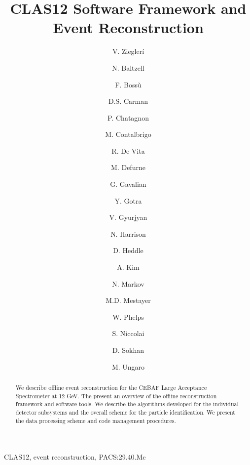 \documentclass[3p,times,twocolumn]{elsarticle}
\begin{document}
\begin{frontmatter}

\title{CLAS12 Software Framework and Event Reconstruction}

\author[JLab]{V. Ziegler\'i}
\author[JLab]{N. Baltzell}
\author[Saclay]{F. Boss\`u}
\author[JLab]{D.S. Carman}
\author[IPNO]{P. Chatagnon}
\author[INFN]{M. Contalbrigo}
\author[INFN]{R. De Vita}
\author[Saclay]{M. Defurne}
\author[JLab]{G. Gavalian}
\author[JLab]{Y. Gotra}
\author[JLab]{V. Gyurjyan}
\author[JLab]{N. Harrison}
\author[CNU]{D. Heddle}
\author[UConn]{A. Kim}
\author[JLab]{N. Markov}
\author[JLab]{M.D. Mestayer}
\author[CNU]{W. Phelps}
\author[IPNO]{S. Niccolai}
\author[Glasgow]{D. Sokhan}
\author[JLab]{M. Ungaro}

\address[JLab]{Thomas Jefferson National Accelerator Facility, Newport News, VA 23606, USA}
\address[CNU]{Christopher Newport University, 1 Avenue of the Arts, Newport News, 23606 VA , USA}
\address[UConn]{University of Connecticut, Storrs, CT 06269, USA}
\address[INFN]{INFN, Sezione di Genova, 16146 Genova, Italy}
\address[Saclay]{CEA-Saclay, Univ. Paris-Sud, Universit\'e Paris-Saclay, Gif-sur-Yvettes, France}
\address[IPNO]{Institut de Physique Nucl\'eaire, CNRS-IN2P3, Univ. Paris-Sud, Universit\'e Paris-Saclay,
91406 Orsay Cedex, France}
\address[Glasgow]{University of Glasgow, Glasgow G12 8QQ, United Kingdom}



\begin{abstract}
We describe offline event reconstruction for the CEBAF Large Acceptance Spectrometer at 12 GeV.
The present an overview of the offline reconstruction framework and software tools.
We describe the algorithms developed for the individual detector subsystems and the overall scheme for the
particle identification.  We present the data processing scheme and code management procedures.
\end{abstract}

\begin{keyword}
CLAS12, event reconstruction, PACS:29.40.Mc
\end{keyword}

\end{frontmatter}
\end{document}
